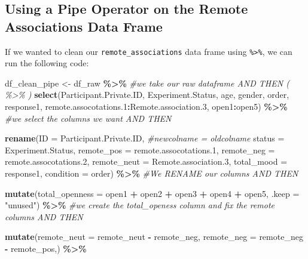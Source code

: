 \documentclass[
]{book}
\newenvironment{Shaded}{\begin{snugshade}}{\end{snugshade}}
\newcommand{\AttributeTok}[1]{\textcolor[rgb]{0.13,0.29,0.53}{#1}}
\newcommand{\CommentTok}[1]{\textcolor[rgb]{0.56,0.35,0.01}{\textit{#1}}}
\newcommand{\FloatTok}[1]{\textcolor[rgb]{0.00,0.00,0.81}{#1}}
\newcommand{\FunctionTok}[1]{\textcolor[rgb]{0.13,0.29,0.53}{\textbf{#1}}}
\newcommand{\NormalTok}[1]{#1}
\newcommand{\OtherTok}[1]{\textcolor[rgb]{0.56,0.35,0.01}{#1}}
\newcommand{\SpecialCharTok}[1]{\textcolor[rgb]{0.81,0.36,0.00}{\textbf{#1}}}
\newcommand{\StringTok}[1]{\textcolor[rgb]{0.31,0.60,0.02}{#1}}
\begin{document}
\hypertarget{using-a-pipe-operator-on-the-remote-associations-data-frame}{%
\subsection{Using a Pipe Operator on the Remote Associations Data Frame}\label{using-a-pipe-operator-on-the-remote-associations-data-frame}}

If we wanted to clean our \texttt{remote\_associations} data frame using \texttt{\%\textgreater{}\%}, we can run the following code:

\begin{Shaded}
\begin{Highlighting}[]
\NormalTok{df\_clean\_pipe }\OtherTok{\textless{}{-}}\NormalTok{ df\_raw }\SpecialCharTok{\%\textgreater{}\%}  \CommentTok{\#we take our raw dataframe AND THEN ( \%\textgreater{}\% )}
  \FunctionTok{select}\NormalTok{(Participant.Private.ID, Experiment.Status, age, gender, order, response1, remote.assocotations}\FloatTok{.1}\SpecialCharTok{:}\NormalTok{Remote.association}\FloatTok{.3}\NormalTok{, open1}\SpecialCharTok{:}\NormalTok{open5) }\SpecialCharTok{\%\textgreater{}\%}  \CommentTok{\#we select the columns we want AND THEN }
  
  \FunctionTok{rename}\NormalTok{(}\AttributeTok{ID =}\NormalTok{ Participant.Private.ID, }\CommentTok{\#newcolname = oldcolname}
         \AttributeTok{status =}\NormalTok{ Experiment.Status,}
         \AttributeTok{remote\_pos =}\NormalTok{ remote.assocotations}\FloatTok{.1}\NormalTok{,}
         \AttributeTok{remote\_neg =}\NormalTok{ remote.assocotations}\FloatTok{.2}\NormalTok{,}
         \AttributeTok{remote\_neut =}\NormalTok{ Remote.association}\FloatTok{.3}\NormalTok{,}
         \AttributeTok{total\_mood =}\NormalTok{ response1,}
         \AttributeTok{condition =}\NormalTok{ order) }\SpecialCharTok{\%\textgreater{}\%} \CommentTok{\#We RENAME our columns AND THEN}
  
  \FunctionTok{mutate}\NormalTok{(}\AttributeTok{total\_openness =}\NormalTok{ open1 }\SpecialCharTok{+}\NormalTok{ open2 }\SpecialCharTok{+}\NormalTok{ open3 }\SpecialCharTok{+}\NormalTok{ open4 }\SpecialCharTok{+}\NormalTok{ open5,}
                    \AttributeTok{.keep =} \StringTok{"unused"}\NormalTok{) }\SpecialCharTok{\%\textgreater{}\%} \CommentTok{\#we create the total\_openess column and fix the remote columns AND THEN}
  
  \FunctionTok{mutate}\NormalTok{(}\AttributeTok{remote\_neut =}\NormalTok{ remote\_neut }\SpecialCharTok{{-}}\NormalTok{ remote\_neg,}
         \AttributeTok{remote\_neg =}\NormalTok{ remote\_neg }\SpecialCharTok{{-}}\NormalTok{ remote\_pos,) }\SpecialCharTok{\%\textgreater{}\%} 
  

\end{Highlighting}
\end{Shaded}
\end{document}
